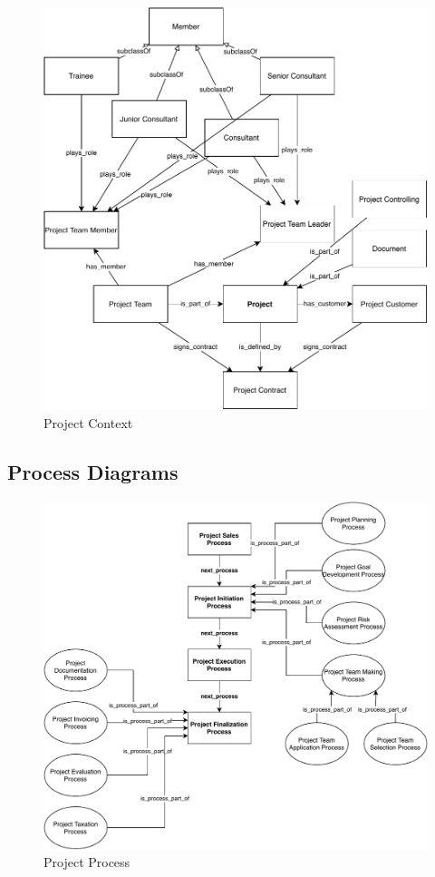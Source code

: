 \documentclass[a4paper, DIV=13, BCOR=0cm]{scrbook}
\begin{document}
\begin{figure}[h]
	\caption{Project Context}
	\centering
	\includegraphics[width=\textwidth]{Diagrams/project-context.pdf}
\end{figure}
\clearpage

\subsection{Process Diagrams}
\label{process-diagrams}
\begin{figure}[h]
	\caption{Project Process}
	\centering
	\includegraphics[width=1\textwidth]{Diagrams/project-process.pdf}
\end{figure}
\end{document}
